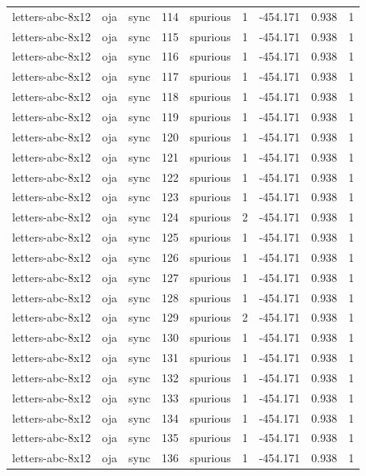 \begin{tabular}{lllrlrrrr}
letters-abc-8x12 & oja & sync & 114 & spurious & 1 & -454.171 & 0.938 & 1 \\
letters-abc-8x12 & oja & sync & 115 & spurious & 1 & -454.171 & 0.938 & 1 \\
letters-abc-8x12 & oja & sync & 116 & spurious & 1 & -454.171 & 0.938 & 1 \\
letters-abc-8x12 & oja & sync & 117 & spurious & 1 & -454.171 & 0.938 & 1 \\
letters-abc-8x12 & oja & sync & 118 & spurious & 1 & -454.171 & 0.938 & 1 \\
letters-abc-8x12 & oja & sync & 119 & spurious & 1 & -454.171 & 0.938 & 1 \\
letters-abc-8x12 & oja & sync & 120 & spurious & 1 & -454.171 & 0.938 & 1 \\
letters-abc-8x12 & oja & sync & 121 & spurious & 1 & -454.171 & 0.938 & 1 \\
letters-abc-8x12 & oja & sync & 122 & spurious & 1 & -454.171 & 0.938 & 1 \\
letters-abc-8x12 & oja & sync & 123 & spurious & 1 & -454.171 & 0.938 & 1 \\
letters-abc-8x12 & oja & sync & 124 & spurious & 2 & -454.171 & 0.938 & 1 \\
letters-abc-8x12 & oja & sync & 125 & spurious & 1 & -454.171 & 0.938 & 1 \\
letters-abc-8x12 & oja & sync & 126 & spurious & 1 & -454.171 & 0.938 & 1 \\
letters-abc-8x12 & oja & sync & 127 & spurious & 1 & -454.171 & 0.938 & 1 \\
letters-abc-8x12 & oja & sync & 128 & spurious & 1 & -454.171 & 0.938 & 1 \\
letters-abc-8x12 & oja & sync & 129 & spurious & 2 & -454.171 & 0.938 & 1 \\
letters-abc-8x12 & oja & sync & 130 & spurious & 1 & -454.171 & 0.938 & 1 \\
letters-abc-8x12 & oja & sync & 131 & spurious & 1 & -454.171 & 0.938 & 1 \\
letters-abc-8x12 & oja & sync & 132 & spurious & 1 & -454.171 & 0.938 & 1 \\
letters-abc-8x12 & oja & sync & 133 & spurious & 1 & -454.171 & 0.938 & 1 \\
letters-abc-8x12 & oja & sync & 134 & spurious & 1 & -454.171 & 0.938 & 1 \\
letters-abc-8x12 & oja & sync & 135 & spurious & 1 & -454.171 & 0.938 & 1 \\
letters-abc-8x12 & oja & sync & 136 & spurious & 1 & -454.171 & 0.938 & 1 \\

\end{tabular}
